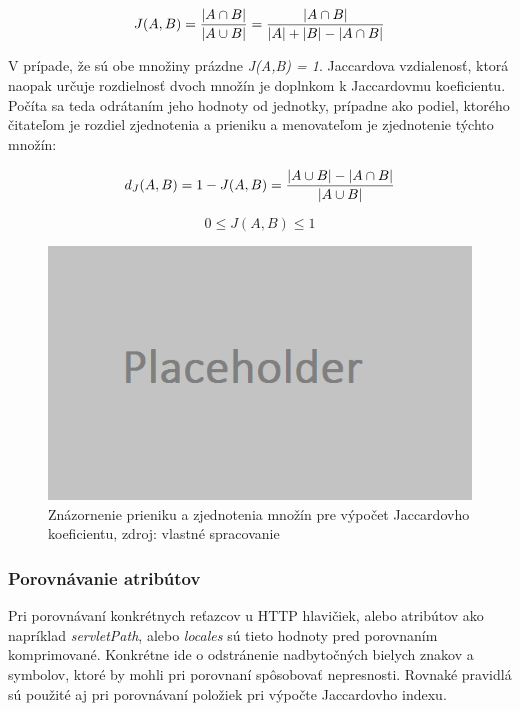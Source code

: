 \documentclass[
  digital, %
  table,   %
  lof,     %
  nolot,   %
  nocover
]{fithesis3}
\begin{document}
\begin{equation}
 J(A,B) = {{|A \cap B|}\over{|A \cup B|}} = {{|A \cap B|}\over{|A| + |B| - |A \cap B|}}
\end{equation}

V prípade, že sú obe množiny prázdne \textit{J(A,B) = 1}.
Jaccardova vzdialenosť, ktorá naopak určuje rozdielnosť dvoch množín je
doplnkom k Jaccardovmu koeficientu. Počíta sa teda odrátaním jeho hodnoty od
jednotky, prípadne ako podiel, ktorého čitateľom je rozdiel zjednotenia a
prieniku a menovateľom je zjednotenie týchto množín:

\begin{equation}
 d_J(A,B) = 1 - J(A,B) = { { |A \cup B| - |A \cap B| } \over |A \cup B| }
\end{equation}

\begin{equation}
 0\le J(A,B)\le 1
\end{equation}

\begin{figure}[h]
  \centering
    \includegraphics[width=.99\textwidth]{images/footprint-jacc-sets.png}
  \caption{Znázornenie prieniku a zjednotenia množín pre výpočet Jaccardovho
  koeficientu, zdroj: vlastné spracovanie}
  \label{fig:footprint-jacc-sets}
\end{figure}

\subsubsection{Porovnávanie atribútov}
Pri porovnávaní konkrétnych reťazcov u HTTP hlavičiek, alebo atribútov ako
napríklad \textit{servletPath}, alebo \textit{locales} sú tieto hodnoty pred
porovnaním komprimované. Konkrétne ide o odstránenie nadbytočných bielych
znakov a symbolov, ktoré by mohli pri porovnaní spôsobovať nepresnosti. Rovnaké
pravidlá sú použité aj pri porovnávaní položiek pri výpočte Jaccardovho indexu.
\end{document}
